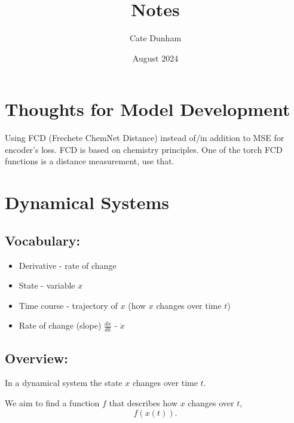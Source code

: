 \documentclass{article}
\title{Notes}
\author{Cate Dunham}
\date{August 2024}
\begin{document}
\maketitle

\section{Thoughts for Model Development}

Using FCD (Frechete ChemNet Distance) instead of/in addition to MSE for encoder's loss. FCD is based on chemistry principles. 
One of the torch FCD functions is a distance measurement, use that.

\section{Dynamical Systems}


\subsection{Vocabulary:}
\begin{itemize}
    \item Derivative - rate of change
    \item State - variable $x$
    \item Time course - trajectory of $x$ (how $x$ changes over time $t$)
    \item Rate of change (slope) $\frac{dx}{dk}$ - $\dot{x}$
\end{itemize}

\subsection{Overview:}
In a dynamical system the state $x$ changes over time $t$.

We aim to find a function $f$ that describes how $x$ changes over $t$, 
\begin{equation}
    f(x(t)).
\end{equation}
\end{document}
